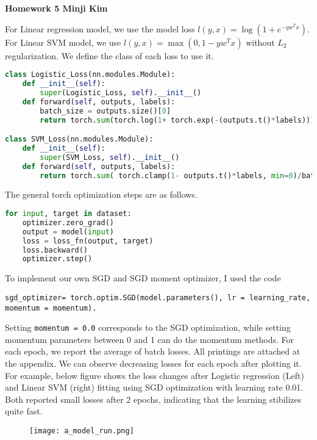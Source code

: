 \documentclass[10pt]{article}
\newcommand{\0}{{\mathbf{0}}}
\newcommand{\1}{{\mathbf{1}}}
\newcommand{\pr}[1]{\noindent{\bf #1.}}
\begin{document}
\begin{title}
{\Large\bf Homework 5 Minji Kim}
\end{title}
\date{}
\maketitle



\vspace{-.9in}
\pr{(a)} For Linear regression model, we use the model loss $l(y,x) = \log{(1+e^{-yw^Tx})}$. For Linear SVM model, we use $l(y,x) = \max(0, 1-yw^Tx)$ without $L_2$ regularization. We define the class of each loss to use it. 
\begin{lstlisting}[language=Python]
class Logistic_Loss(nn.modules.Module):
    def __init__(self):
        super(Logistic_Loss, self).__init__()
    def forward(self, outputs, labels):
        batch_size = outputs.size()[0]
        return torch.sum(torch.log(1+ torch.exp(-(outputs.t()*labels))))/batch_size

class SVM_Loss(nn.modules.Module):
    def __init__(self):
        super(SVM_Loss, self).__init__()
    def forward(self, outputs, labels):
        return torch.sum( torch.clamp(1- outputs.t()*labels, min=0)/batch_size )
\end{lstlisting}

The general torch optimization steps are as follows. 
\begin{lstlisting}[language=Python]
for input, target in dataset:
    optimizer.zero_grad()
    output = model(input)
    loss = loss_fn(output, target)
    loss.backward()
    optimizer.step()
\end{lstlisting}
To implement our own SGD and SGD moment optimizer, I used the code 
\begin{verbatim}
sgd_optimizer= torch.optim.SGD(model.parameters(), lr = learning_rate, momentum = momentum).
\end{verbatim}
Setting \texttt{momentum = 0.0} corresponds to the SGD optimization, while setting momentum parameters between 0 and 1 can do the momentum methods.
For each epoch, we report the average of batch losses. All printings are attached at the appendix. We can observe decreasing losses for each epoch after plotting it. For example, below figure shows the loss changes after Logistic regression (Left) and Linear SVM (right) fitting using SGD optimization with learning rate 0.01. Both reported small losses after 2 epochs, indicating that the learning stibilizes quite fast.
\begin{figure}[ht]
\centering
        \texttt{[image: a\_model\_run.png]}
\end{figure}
\end{document}
